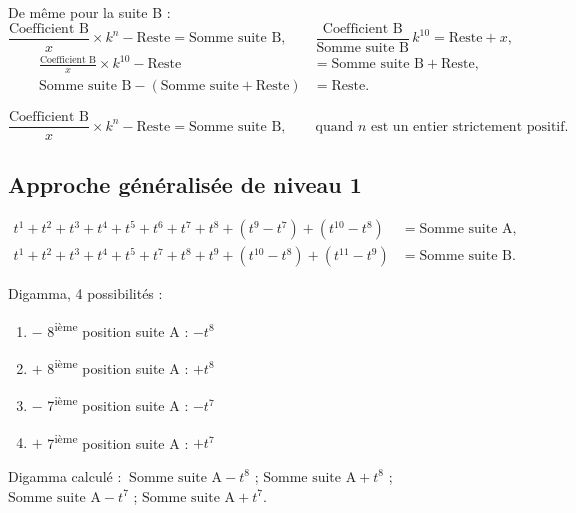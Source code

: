 \documentclass[11pt,a4paper]{article}
\begin{document}
De même pour la suite B :
\[
\frac{\text{Coefficient B}}{x} \times k^{n} - \text{Reste} = \text{Somme suite B},
\qquad
\frac{\text{Coefficient B}}{\text{Somme suite B}}\, k^{10} = \text{Reste} + x ,
\]
\begin{align*}
\frac{\text{Coefficient B}}{x}\times k^{10}-\text{Reste}
&=\text{Somme suite B}+\text{Reste},\\
\text{Somme suite B}-(\text{Somme suite}+\text{Reste})
&=\text{Reste}.
\end{align*}

\vspace{0.3cm}
\begin{boiteformule}
\[
\frac{\text{Coefficient B}}{x} \times k^{n} - \text{Reste} = \text{Somme suite B},
\qquad \text{quand } n \text{ est un entier strictement positif.}
\]
\end{boiteformule}

\subsection{Approche généralisée de niveau 1}

\vspace{0.3cm}
\begin{boiteformule}[Sommes des suites A et B (forme formelle, $n = 10$)]
\begin{align*}
t^{1}+t^{2}+t^{3}+t^{4}+t^{5}+t^{6}+t^{7}+t^{8}+(t^{9}-t^{7})+(t^{10}-t^{8}) &= \text{Somme suite A},\\
t^{1}+t^{2}+t^{3}+t^{4}+t^{5}+t^{7}+t^{8}+t^{9}+(t^{10}-t^{8})+(t^{11}-t^{9}) &= \text{Somme suite B}.
\end{align*}
\end{boiteformule}

Digamma, 4 possibilités :
\begin{enumerate}[nosep]
  \item $-$ 8\textsuperscript{ième} position suite A : $-t^{8}$
  \item $+$ 8\textsuperscript{ième} position suite A : $+t^{8}$
  \item $-$ 7\textsuperscript{ième} position suite A : $-t^{7}$
  \item $+$ 7\textsuperscript{ième} position suite A : $+t^{7}$
\end{enumerate}

Digamma calculé : $\ \text{Somme suite A} - t^{8}$ ;\quad
$\text{Somme suite A} + t^{8}$ ;\quad
$\text{Somme suite A} - t^{7}$ ;\quad
$\text{Somme suite A} + t^{7}$.
\end{document}
